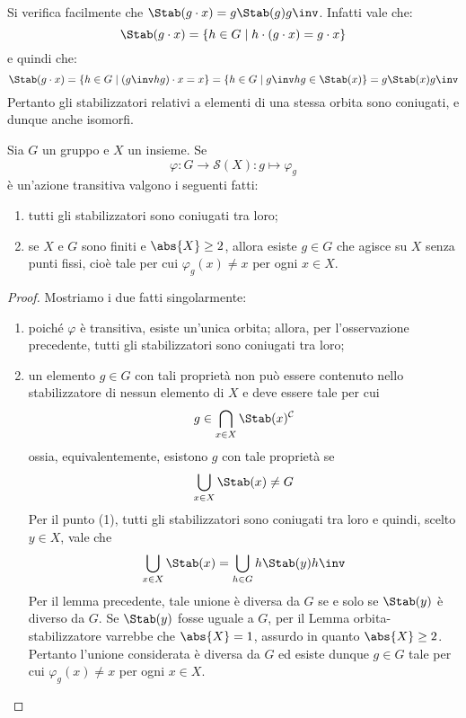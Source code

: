 \documentclass[11pt]{scrartcl}
\begin{document}
	\begin{remark}
		Si verifica facilmente che $\Stab(g \cdot x) = g \Stab(g) g\inv$. Infatti
		vale che:
		\[ \Stab(g \cdot x) = \{ h \in G \mid h \cdot (g \cdot x) = g \cdot x \} \]
		e quindi che:
		\[ \Stab(g \cdot x) = \{ h \in G \mid (g\inv h g) \cdot x = x \} = \{ h \in G \mid g\inv h g \in \Stab(x) \} = g \Stab(x) g\inv \]
		Pertanto gli stabilizzatori relativi a elementi di una stessa orbita sono
		coniugati, e dunque anche isomorfi.
	\end{remark}
	
	\begin{proposition}
		\label{prop1.41}
		Sia $G$ un gruppo e $X$ un insieme. Se 
		\[
		\varphi:G\longrightarrow \mathcal{S}(X) :g\longmapsto \varphi_g
		\] è un'azione transitiva valgono i seguenti fatti:
		\begin{enumerate}[(1)]
			\item tutti gli stabilizzatori sono coniugati tra loro;
			\item se $X$ e $G$ sono finiti e $\abs{X} \geq 2$, allora esiste $g \in G$ che agisce su $X$ senza
			punti fissi, cioè tale per cui $\varphi_g(x) \neq x$ per ogni $x \in X$.
		\end{enumerate}
	\end{proposition}
	
	\begin{proof}
		Mostriamo i due fatti singolarmente:
		\begin{enumerate}[(1)]
			\item poiché $\varphi$ è transitiva, esiste un'unica orbita; allora,
			per l'osservazione precedente, tutti gli stabilizzatori sono coniugati tra
			loro;
			\item un elemento $g \in G$ con tali proprietà non può essere contenuto 
			nello stabilizzatore di nessun elemento di $X$ e deve essere tale
			per cui
			\[
			g \in \bigcap_{x \in X}\Stab(x)^{\mathcal{C}}
			\]
			ossia, equivalentemente, esistono $g$ con tale proprietà se
			\[
			\bigcup_{x \in X} \Stab(x) \neq G
			\]
			Per il punto (1), tutti gli stabilizzatori sono coniugati tra loro
			e quindi, scelto $y \in X$, vale che
			\[
			\bigcup_{x \in X} \Stab(x) = \bigcup_{h \in G} h \Stab(y) h\inv
			\]
			Per il lemma precedente, tale unione è diversa da $G$ se e solo se $\Stab(y)$ è diverso da $G$. Se $\Stab(y)$ fosse uguale a $G$, per il Lemma orbita-stabilizzatore
			varrebbe che $\abs{X} = 1$, assurdo in quanto $\abs{X} \geq 2$.
			Pertanto l'unione considerata è diversa da $G$ ed esiste dunque $g \in G$
			tale per cui $\varphi_g(x) \neq x$ per ogni $x \in X$.
		\end{enumerate}
	\end{proof}
	
\end{document}
